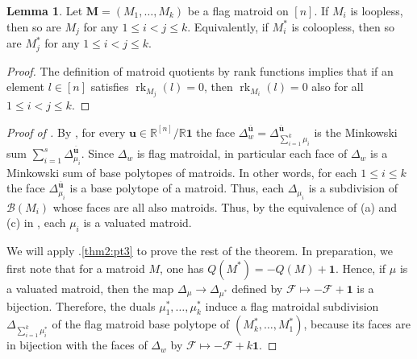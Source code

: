 \documentclass[11pt]{amsart}
\newcommand{\RR}{\mathbb R}
\newcommand{\bb}{\mathcal B}
\newcommand{\MM}{{\boldsymbol M}}
\newcommand{\bu}{{\mathbf u}}
\theoremstyle{definition}
\newtheorem{lem}[thm]{Lemma}
\begin{document}

\begin{lem}\label{lem:propagate}
Let $\MM = (M_1, \ldots, M_k)$ be a flag matroid on $[n]$.  If $M_i$ is loopless, then so are $M_j$ for any $1\leq i < j \leq k$.  Equivalently, if $M_i^*$ is coloopless, then so are $M_j^*$ for any $1\leq i < j \leq k$.
\end{lem}

\begin{proof}
The definition of matroid quotients by rank functions implies that if an element $l\in [n]$ satisfies $\operatorname{rk}_{M_j}(l) = 0$, then $\operatorname{rk}_{M_i}(l) = 0$ also for all $1\leq i<j\leq k$.
\end{proof}


\begin{proof}[Proof of ]
By , for every $\bu\in \RR^{[n]}/\RR\mathbf 1$ the face $\Delta_w^{\overline\bu} = \Delta_{\sum_{i=1}^k \mu_i}^{\overline\bu}$ is the Minkowski sum $\sum_{i=1}^s \Delta_{\mu_i}^{\overline\bu}$.  Since $\Delta_w$ is flag matroidal, in particular each face of $\Delta_w$ is a Minkowski sum of base polytopes of matroids.  In other words, for each $1\leq i\leq k$ the face $\Delta_{\mu_i}^{\overline\bu}$ is a base polytope of a matroid.  Thus, each $\Delta_{\mu_i}$ is a subdivision of $\bb({M_i})$ whose faces are all also matroids.  Thus, by the equivalence of (a) and (c) in , each $\mu_i$ is a valuated matroid.

We will apply .\ref{thm2:pt3} to prove the rest of the theorem.  In preparation, we first note that for a matroid $M$, one has $Q(M^*) = -Q(M) + \mathbf 1$. Hence, if $\mu$ is a valuated matroid, then the map $\Delta_\mu \to \Delta_{\mu^*}$ defined by $\mathcal F \mapsto -\mathcal F + \mathbf 1$ is a bijection.  Therefore, the duals $\mu_1^*, \ldots, \mu_k^*$ induce a flag matroidal subdivision $\Delta_{\sum_{i=1}^k \mu_i^*}$ of the flag matroid base polytope of $(M_k^*, \dots, M_1^*)$, because its faces are in bijection with the faces of $\Delta_w$ by $\mathcal  F \mapsto -\mathcal F + k\mathbf 1$.  


\end{proof}
\end{document}
